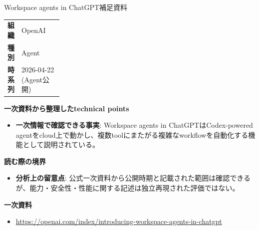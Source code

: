 \begin{technicalnote}{Workspace agents in ChatGPT}{補足資料}
\begingroup
\begin{tabularx}{\linewidth}{@{}>{\bfseries}p{0.22\linewidth}X@{}}
組織 & OpenAI \\
種別 & Agent \\
時系列 & 2026-04-22 (Agent公開) \\
\end{tabularx}
\smallskip
{\bfseries 一次資料から整理したtechnical points}
\begin{itemize}[leftmargin=1.5em,itemsep=0.35em]
\item \textbf{一次情報で確認できる事実}: Workspace agents in ChatGPTはCodex-powered agentをcloud上で動かし、複数toolにまたがる複雑なworkflowを自動化する機能として説明されている。
\end{itemize}
{\bfseries 読む際の境界}
\begin{itemize}[leftmargin=1.5em,itemsep=0.35em]
\item \textbf{分析上の留意点}: 公式一次資料から公開時期と記載された範囲は確認できるが、能力・安全性・性能に関する記述は独立再現された評価ではない。
\end{itemize}
\begin{samepage}
{\bfseries 一次資料}
\begingroup\sloppy
\begin{itemize}[leftmargin=1.5em,itemsep=0.25em]
\item {\scriptsize\url{https://openai.com/index/introducing-workspace-agents-in-chatgpt}}
\end{itemize}
\endgroup
\end{samepage}
\endgroup
\end{technicalnote}
\medskip

